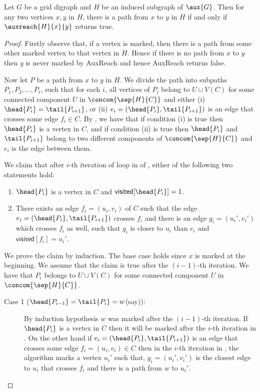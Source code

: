 \documentclass{toc}
\begin{document}
\begin{lemma}
\label{lem:algo_correctness}
Let $G$ be a grid %
digraph %
 and $H$ be %
an%
induced subgraph of $\aux{G}$. Then for any two vertices $x,y$ in $H$, there is a path from $x$ to $y$ in $H$ if and only if $\auxreach{H}{x}{y}$ returns \textsf{true}.
\end{lemma}
\begin{proof}
Firstly observe that, if a vertex is marked, then there is a path from some other marked vertex to that vertex in $H$. Hence if there is no path from $x$ to $y$ then $y$ is never marked by \textsf{AuxReach} and hence \textsf{AuxReach} returns \textsf{false}.

Now let $P$ be a path from $x$ to $y$ in $H$. We divide the path into subpaths $P_1, P_2 , \ldots , P_{\ell}$, such that for each $i$, all vertices of $P_i$ belong to $U \cup V(C)$ for some connected component $U$ in $\concom{\sep{H}{C}}$ and either (i) $\head{P_i} = \tail{P_{i+1}}$, or (ii) $e_i = (\head{P_i} , \tail{P_{i+1}})$ is an edge that crosses some edge $f_i \in C$. By , we have that if condition (i) is true then $\head{P_i}$ is a vertex in $C$, and if condition (ii) is true then $\head{P_i}$ and $\tail{P_{i+1}}$ belong to two different components of $\concom{\sep{H}{C}}$ and $e_i$ is the edge between them.

We claim that after $i$-th iteration of loop in  of , either of the following two statements hold:
\begin{enumerate}
\item $\head{P_i}$ is a vertex in $C$ and $\textsf{visited}[\head{P_i}] = 1$.
\item There exists an edge $f_i = (u_i, v_i)$ of $C$ such that the edge $e_i = (\head{P_i}, \tail{P_{i+1}})$ crosses $f_i$ and there is an edge $g_i = (u_i',v_i')$ which crosses $f_i$ as well, such that $g_i$ is closer to $u_i$ than $e_i$ and $\textsf{visited}[f_i] = u_i'$.
\end{enumerate}
We prove the claim by induction. The base case holds since $x$ is marked at the beginning. We assume that the claim is true after the $(i-1)$-th iteration. We have that $P_i$ belongs to $U \cup V(C)$ for some connected component $U$ in $\concom{\sep{H}{C}}$.
\begin{description}
\item[Case 1 ($\head{P_{i-1}} = \tail{P_{i}} = w$(say)):] By induction hypothesis $w$ was marked after the $(i-1)$-th iteration. If $\head{P_i}$ is a vertex in $C$ then it will be marked after the $i$-th iteration in . On the other hand if $e_i = (\head{P_i} , \tail{P_{i+1}})$ is an edge that crosses some edge $f_i = (u_i,v_i) \in C$ then in the $i$-th iteration in , the algorithm marks a vertex $u_i'$ such that, $g_i = (u_i',v_i')$ is the closest edge to $u_i$ that crosses $f_i$ and there is a path from $w$ to $u_i'$.


\end{description}
\end{proof}
\end{document}
